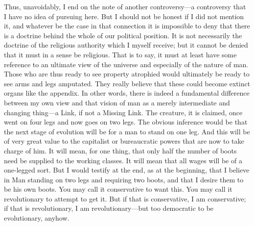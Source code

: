 \documentclass{book}
\begin{document}
Thus, unavoidably, I end on the note of another controversy—a controversy that I have no idea of pursuing here. But I should not be honest if I did not mention it, and whatever be the case in that connection it is impossible to deny that there is a doctrine behind the whole of our political position. It is not necessarily the doctrine of the religious authority which I myself receive; but it cannot be denied that it must in a sense be religious. That is to say, it must at least have some reference to an ultimate view of the universe and especially of the nature of man. Those who are thus ready to see property atrophied would ultimately be ready to see arms and legs amputated. They really believe that these could become extinct organs like the appendix. In other words, there is indeed a fundamental difference between my own view and that vision of man as a merely intermediate and changing thing—a Link, if not a Missing Link. The creature, it is claimed, once went on four legs and now goes on two legs. The obvious inference would be that the next stage of evolution will be for a man to stand on one leg. And this will be of very great value to the capitalist or bureaucratic powers that are now to take charge of him. It will mean, for one thing, that only half the number of boots need be supplied to the working classes. It will mean that all wages will be of a one-legged sort. But I would testify at the end, as at the beginning, that I believe in Man standing on two legs and requiring two boots, and that I desire them to be his own boots. You may call it conservative to want this. You may call it revolutionary to attempt to get it. But if that is conservative, I am conservative; if that is revolutionary, I am revolutionary—but too democratic to be evolutionary, anyhow.
\end{document}
